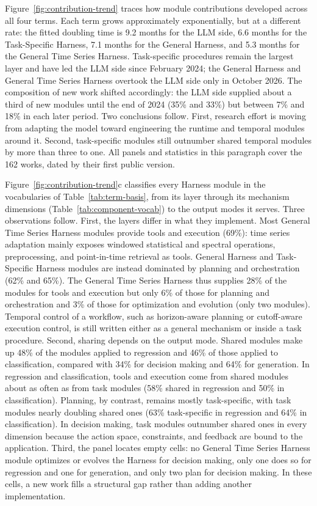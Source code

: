 \documentclass[preprints,article,submit,moreauthors]{Definitions/mdpi}
\begin{document}
Figure~\ref{fig:contribution-trend} traces how module contributions developed across all four terms. Each term grows approximately exponentially, but at a different rate: the fitted doubling time is 9.2 months for the LLM side, 6.6 months for the Task-Specific Harness, 7.1 months for the General Harness, and 5.3 months for the General Time Series Harness. Task-specific procedures remain the largest layer and have led the LLM side since February 2024; the General Harness and General Time Series Harness overtook the LLM side only in October 2026. The composition of new work shifted accordingly: the LLM side supplied about a third of new modules until the end of 2024 (35\% and 33\%) but between 7\% and 18\% in each later period. Two conclusions follow. First, research effort is moving from adapting the model toward engineering the runtime and temporal modules around it. Second, task-specific modules still outnumber shared temporal modules by more than three to one. All panels and statistics in this paragraph cover the 162 works, dated by their first public version.

Figure~\ref{fig:contribution-trend}c classifies every Harness module in the vocabularies of Table~\ref{tab:term-basis}, from its layer through its mechanism dimensions (Table~\ref{tab:component-vocab}) to the output modes it serves. Three observations follow. First, the layers differ in what they implement. Most General Time Series Harness modules provide tools and execution (69\%): time series adaptation mainly exposes windowed statistical and spectral operations, preprocessing, and point-in-time retrieval as tools. General Harness and Task-Specific Harness modules are instead dominated by planning and orchestration (62\% and 65\%). The General Time Series Harness thus supplies 28\% of the modules for tools and execution but only 6\% of those for planning and orchestration and 3\% of those for optimization and evolution (only two modules). Temporal control of a workflow, such as horizon-aware planning or cutoff-aware execution control, is still written either as a general mechanism or inside a task procedure. Second, sharing depends on the output mode. Shared modules make up 48\% of the modules applied to regression and 46\% of those applied to classification, compared with 34\% for decision making and 64\% for generation. In regression and classification, tools and execution come from shared modules about as often as from task modules (58\% shared in regression and 50\% in classification). Planning, by contrast, remains mostly task-specific, with task modules nearly doubling shared ones (63\% task-specific in regression and 64\% in classification). In decision making, task modules outnumber shared ones in every dimension because the action space, constraints, and feedback are bound to the application. Third, the panel locates empty cells: no General Time Series Harness module optimizes or evolves the Harness for decision making, only one does so for regression and one for generation, and only two plan for decision making. In these cells, a new work fills a structural gap rather than adding another implementation.
\end{document}
